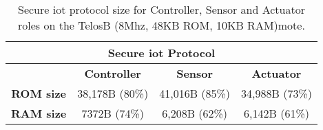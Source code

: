 \documentclass[conference]{./sty/IEEEtran}
\begin{document}
\begin{table}[h] %
  \begin{center} 
  \begin{tabular}{|c|c|c|c|} 
  \hline
  \multicolumn{4}{|c|}{\textbf{Secure iot Protocol}}\\ \hline
                    & \textbf{Controller} & \textbf{Sensor} & \textbf{Actuator} \\ \hline
  \textbf{ROM size} & 38,178B (80\%)      & 41,016B (85\%)  & 34,988B (73\%)    \\ \hline
  \textbf{RAM size} & 7372B (74\%)        & 6,208B  (62\%)  & 6,142B  (61\%)    \\ \hline
  \end{tabular}
  \caption[Table]{Secure iot protocol size for Controller, Sensor and Actuator roles on the TelosB (8Mhz, 48KB ROM, 10KB RAM)mote.}
  \label{tab:implementation}
  \end{center}
\end{table}
\vspace{-0.5cm}
\end{document}
